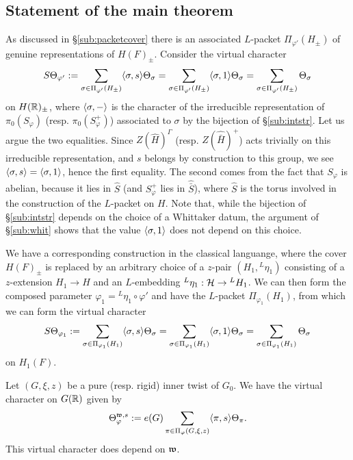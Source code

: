 \documentclass{article}
\theoremstyle{definition}
\numberwithin{equation}{section}
\renewcommand{\-}{\hyp{}}
\begin{document}

\subsection{Statement of the main theorem}

As discussed in \S\ref{sub:packetcover} there is an associated $L$\-packet $\Pi_{\varphi'}(H_\pm)$ of genuine representations of $H(F)_\pm$. Consider the virtual character
\[ S\Theta_{\varphi'} := \sum_{\sigma \in \Pi_{\varphi'}(H_\pm)} \langle\sigma,s\rangle\Theta_\sigma = \sum_{\sigma \in \Pi_{\varphi'}(H_\pm)} \langle\sigma,1\rangle\Theta_\sigma = \sum_{\sigma \in \Pi_{\varphi'}(H_\pm)} \Theta_\sigma\]
on $H(\mathbb{R})_\pm$, where $\langle\sigma,-\rangle$ is the character of the irreducible representation of $\pi_0(S_\varphi)$ (resp. $\pi_0(S_\varphi^+)$) associated to $\sigma$ by the bijection of \S\ref{sub:intstr}. Let us argue the two equalities. Since $Z(\hat H)^\Gamma$ (resp. $Z(\hat{\bar H})^+$) acts trivially on this irreducible representation, and $s$ belongs by construction to this group, we see $\langle\sigma,s\rangle=\langle\sigma,1\rangle$, hence the first equality. The second comes from the fact that $S_\varphi$ is abelian, because it lies in $\hat S$ (and $S_\varphi^+$ lies in $\hat{\bar S}$), where $\hat S$ is the torus involved in the construction of the $L$\-packet on $H$. Note that, while the bijection of \S\ref{sub:intstr} depends on the choice of a Whittaker datum, the argument of \S\ref{sub:whit} shows that the value $\langle\sigma,1\rangle$ does not depend on this choice.

We have a corresponding construction in the classical languange, where the cover $H(F)_\pm$ is replaced by an arbitrary choice of a $z$-pair $(H_1,{^L\eta_1})$ consisting of a $z$-extension $H_1 \to H$ and an $L$-embedding $^L\eta_1 : \mathcal{H} \to {^LH_1}$. We can then form the composed parameter $\varphi_1 = {^L\eta_1} \circ \varphi'$ and have the $L$-packet $\Pi_{\varphi_1}(H_1)$, from which we can form the virtual character
\[ S\Theta_{\varphi_1} := \sum_{\sigma \in \Pi_{\varphi_1}(H_1)} \langle\sigma,s\rangle\Theta_\sigma = \sum_{\sigma \in \Pi_{\varphi_1}(H_1)} \langle\sigma,1\rangle\Theta_\sigma = \sum_{\sigma \in \Pi_{\varphi_1}(H_1)} \Theta_\sigma\]
on $H_1(F)$.

Let $(G,\xi,z)$ be a pure (resp. rigid) inner twist of $G_0$. We have the virtual character on $G(\mathbb{R})$ given by
\[ \Theta_{\varphi}^{\mathfrak{w},s} := e(G)\sum_{\pi \in \Pi_\varphi(G,\xi,z)} \langle\pi,s\rangle\Theta_\pi. \]
This virtual character does depend on $\mathfrak{w}$.
\end{document}

